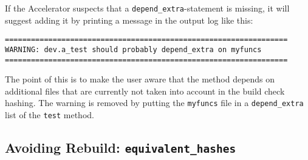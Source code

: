 If the Accelerator suspects that a \texttt{depend\_extra}-statement is
missing, it will suggest adding it by printing a message in the output
log like this:
\begin{snugshade}
\begin{verbatim}
=================================================================
WARNING: dev.a_test should probably depend_extra on myfuncs
=================================================================
\end{verbatim}
\end{snugshade}
\noindent The point of this is to make the user aware that the method
depends on additional files that are currently not taken into account
in the build check hashing.  The warning is removed by putting the
\texttt{myfuncs} file in a \texttt{depend\_extra} list of the
\texttt{test} method.


\subsection{Avoiding Rebuild: \texttt{equivalent\_hashes}}
\label{sec:equivalent_hashes}

